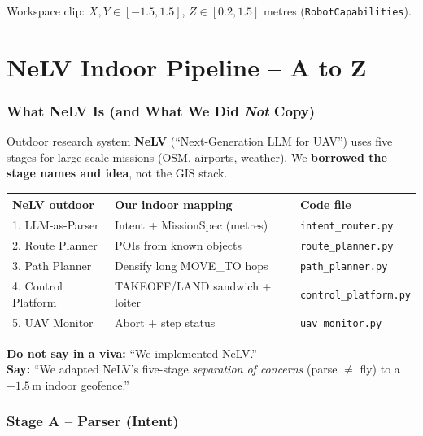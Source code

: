 \documentclass[11pt,a4paper]{article}
\begin{document}
Workspace clip: $X,Y \in [-1.5,1.5]$, $Z \in [0.2,1.5]$ metres
(\texttt{RobotCapabilities}).

\part{NeLV Indoor Pipeline -- A to Z}

\section{What NeLV Is (and What We Did \emph{Not} Copy)}

Outdoor research system \textbf{NeLV} (``Next-Generation LLM for UAV'')
uses five stages for large-scale missions (OSM, airports, weather). We
\textbf{borrowed the stage names and idea}, not the GIS stack.

\begin{center}
\small
\begin{tabular}{lll}
\toprule
\textbf{NeLV outdoor} & \textbf{Our indoor mapping} & \textbf{Code file} \\
\midrule
1. LLM-as-Parser & Intent + MissionSpec (metres) & \texttt{intent\_router.py} \\
2. Route Planner & POIs from known objects & \texttt{route\_planner.py} \\
3. Path Planner & Densify long MOVE\_TO hops & \texttt{path\_planner.py} \\
4. Control Platform & TAKEOFF/LAND sandwich + loiter & \texttt{control\_platform.py} \\
5. UAV Monitor & Abort + step status & \texttt{uav\_monitor.py} \\
\bottomrule
\end{tabular}
\end{center}

\begin{quotebox}
\textbf{Do not say in a viva:} ``We implemented NeLV.''\\
\textbf{Say:} ``We adapted NeLV's five-stage \emph{separation of concerns}
(parse $\neq$ fly) to a $\pm 1.5$\,m indoor geofence.''
\end{quotebox}

\section{Stage A -- Parser (Intent)}
\end{document}
